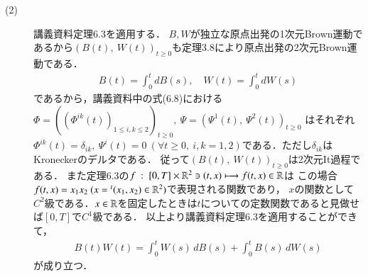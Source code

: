 \begin{description}
	\item[(2)] 講義資料定理6.3を適用する．
		$B,W$が独立な原点出発の1次元Brown運動であるから$(B(t),\ W(t))_{t \geq 0}$も定理3.8により原点出発の2次元Brown運動である．
		\begin{align}
			B(t) = \int_{0}^{t} dB(s), \quad W(t) = \int_{0}^{t} dW(s)
		\end{align}
		であるから，講義資料中の式(6.8)における$\Phi = ((\Phi^{ik}(t))_{1 \leq i, k \leq 2})_{t \geq 0},\ \Psi = (\Psi^1(t),\ \Psi^2(t))_{t \geq 0}$
		はそれぞれ$\Phi^{ik}(t) = \delta_{ik},\ \Psi^i(t) = 0\ (\forall t \geq 0,\ i,k=1,2)$である．ただし$\delta_{ik}$はKroneckerのデルタである．
		従って$(B(t),\ W(t))_{t \geq 0}$は2次元It過程である．
		また定理6.3の$f\ :\ [0, T] \times \mathbb{R}^2 \ni (t,x) \longmapsto f(t,x) \in \mathbb{R}$は
		この場合$f(t,x) = x_1 x_2\ (x = {}^t(x_1, x_2) \in \mathbb{R}^2)$で表現される関数であり，
		$x$の関数として$C^2$級である．$x \in \mathbb{R}$を固定したときは$t$についての定数関数であると見做せば$[0, T]$で$C^1$級である．
		以上より講義資料定理6.3を適用することができて，
		\begin{align}
			B(t)W(t) = \int_{0}^{t} W(s)\, dB(s) + \int_{0}^{t} B(s)\, dW(s)  
		\end{align}
		が成り立つ．
	

\end{description}

